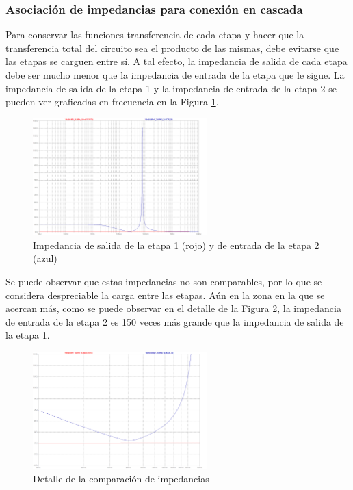 \subsubsection{Asociación de impedancias para conexión en cascada}
Para conservar las funciones transferencia de cada etapa y hacer que la transferencia total del circuito sea el producto de las mismas, debe evitarse que las etapas se carguen entre sí. A tal efecto, la impedancia de salida de cada etapa debe ser mucho menor que la impedancia de entrada de la etapa que le sigue. La impedancia de salida de la etapa 1 y la impedancia de entrada de la etapa 2 se pueden ver graficadas en frecuencia en la Figura \ref{imptodo}.

\begin{figure}[H]
    \centering
    \includegraphics[width=0.6\textwidth]{../Ex3/Resources/imptodo.png}
    \caption{Impedancia de salida de la etapa 1 (rojo) y de entrada de la etapa 2 (azul)}
    \label{imptodo}
\end{figure}

Se puede observar que estas impedancias no son comparables, por lo que se considera despreciable la carga entre las etapas. Aún en la zona en la que se acercan más, como se puede observar en el detalle de la Figura \ref{impdetalle}, la impedancia de entrada de la etapa 2 es 150 veces más grande que la impedancia de salida de la etapa 1.

\begin{figure}[H]
    \centering
    \includegraphics[width=0.6\textwidth]{../Ex3/Resources/impdetalle.png}
    \caption{Detalle de la comparación de impedancias}
    \label{impdetalle}
\end{figure}

